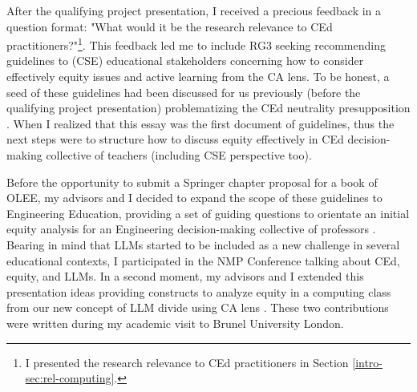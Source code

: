 After the qualifying project presentation, I received a precious feedback in a question format: "What would it be the research relevance to \gls{CEd} practitioners?"\footnote{I presented the research relevance to \gls{CEd} practitioners in Section \ref{intro-sec:rel-computing}.}. This feedback led me to include \gls{RG}3 seeking recommending guidelines to (\gls{CSE}) educational stakeholders concerning how to consider effectively equity issues and active learning from the \acrfull{CA} lens. To be honest, a seed of these guidelines had been discussed for us previously (before the qualifying project presentation) problematizing the \gls{CEd} neutrality presupposition \cite{bispojr:2022-educomp}. When I realized that this essay was the first document of guidelines, thus the next steps were to structure how to discuss equity effectively in \gls{CEd} decision-making collective of teachers (including \gls{CSE} perspective too).

Before the opportunity to submit a Springer chapter proposal for a book of \gls{OLEE}, my advisors and I decided to expand the scope of these guidelines to Engineering Education, providing a set of guiding questions to orientate an initial equity analysis for an Engineering decision-making collective of professors \cite{bispojr:2024-online-lab}. Bearing in mind that \glspl{LLM} started to be included as a new challenge in several educational contexts, I participated in the \gls{NMP} Conference talking about \gls{CEd}, equity, and \glspl{LLM}. In a second moment, my advisors and I extended this presentation ideas providing constructs to analyze equity in a computing class from our new concept of \gls{LLM} divide using \gls{CA} lens \cite{bispojr:2024-nmp}. These two contributions were written during my academic visit to Brunel University London.

